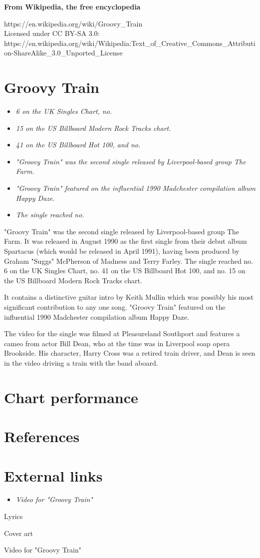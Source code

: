 \textbf{From Wikipedia, the free encyclopedia}

https://en.wikipedia.org/wiki/Groovy\_Train\\
Licensed under CC BY-SA 3.0:\\
https://en.wikipedia.org/wiki/Wikipedia:Text\_of\_Creative\_Commons\_Attribution-ShareAlike\_3.0\_Unported\_License

\section{Groovy Train}\label{groovy-train}

\begin{itemize}
\item
  \emph{6 on the UK Singles Chart, no.}
\item
  \emph{15 on the US Billboard Modern Rock Tracks chart.}
\item
  \emph{41 on the US Billboard Hot 100, and no.}
\item
  \emph{"Groovy Train" was the second single released by Liverpool-based
  group The Farm.}
\item
  \emph{"Groovy Train" featured on the influential 1990 Madchester
  compilation album Happy Daze.}
\item
  \emph{The single reached no.}
\end{itemize}

"Groovy Train" was the second single released by Liverpool-based group
The Farm. It was released in August 1990 as the first single from their
debut album Spartacus (which would be released in April 1991), having
been produced by Graham "Suggs" McPherson of Madness and Terry Farley.
The single reached no. 6 on the UK Singles Chart, no. 41 on the US
Billboard Hot 100, and no. 15 on the US Billboard Modern Rock Tracks
chart.

It contains a distinctive guitar intro by Keith Mullin which was
possibly his most significant contribution to any one song. "Groovy
Train" featured on the influential 1990 Madchester compilation album
Happy Daze.

The video for the single was filmed at Pleasureland Southport and
features a cameo from actor Bill Dean, who at the time was in Liverpool
soap opera Brookside. His character, Harry Cross was a retired train
driver, and Dean is seen in the video driving a train with the band
aboard.

\section{Chart performance}\label{chart-performance}

\section{References}\label{references}

\section{External links}\label{external-links}

\begin{itemize}
\item
  \emph{Video for "Groovy Train"}
\end{itemize}

Lyrics

Cover art

Video for "Groovy Train"
